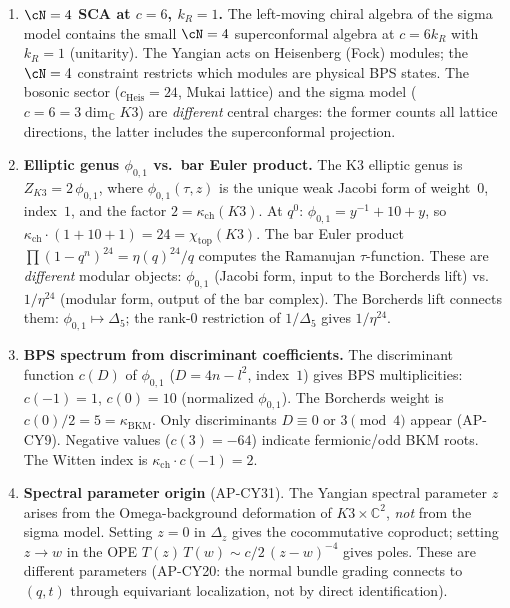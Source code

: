 \begin{enumerate}
\item \textbf{$\cN = 4$ SCA at $c = 6$, $k_R = 1$.}
  The left-moving chiral algebra of the sigma model contains the
  small $\cN = 4$ superconformal algebra at $c = 6 k_R$ with $k_R = 1$
  (unitarity).  The Yangian acts on Heisenberg (Fock) modules; the
  $\cN = 4$ constraint restricts which modules are physical BPS states.
  The bosonic sector ($c_{\mathrm{Heis}} = 24$, Mukai lattice) and the
  sigma model ($c = 6 = 3 \dim_{\mathbb{C}} K3$) are \emph{different}
  central charges: the former counts all lattice directions, the latter
  includes the superconformal projection.

\item \textbf{Elliptic genus $\phi_{0,1}$ vs.\ bar Euler product.}
  The K3 elliptic genus is $Z_{K3} = 2\,\phi_{0,1}$, where
  $\phi_{0,1}(\tau, z)$ is the unique weak Jacobi form of weight~$0$,
  index~$1$, and the factor $2 = \kappa_{\mathrm{ch}}(K3)$.
  At $q^0$: $\phi_{0,1} = y^{-1} + 10 + y$,
  so $\kappa_{\mathrm{ch}} \cdot (1 + 10 + 1) = 24 = \chi_{\mathrm{top}}(K3)$.
  The bar Euler product $\prod(1 - q^n)^{24} = \eta(q)^{24}/q$ computes
  the Ramanujan $\tau$-function.
  These are \emph{different} modular objects: $\phi_{0,1}$ (Jacobi form,
  input to the Borcherds lift) vs.\ $1/\eta^{24}$ (modular form, output
  of the bar complex).  The Borcherds lift connects them:
  $\phi_{0,1} \mapsto \Delta_5$; the rank-$0$ restriction of
  $1/\Delta_5$ gives $1/\eta^{24}$.

\item \textbf{BPS spectrum from discriminant coefficients.}
  The discriminant function $c(D)$ of $\phi_{0,1}$ ($D = 4n - l^2$,
  index~$1$) gives BPS multiplicities: $c(-1) = 1$, $c(0) = 10$
  (normalized $\phi_{0,1}$).
  The Borcherds weight is $c(0)/2 = 5 = \kappa_{\mathrm{BKM}}$.
  Only discriminants $D \equiv 0$ or $3 \pmod{4}$ appear (AP-CY9).
  Negative values ($c(3) = -64$) indicate fermionic/odd BKM roots.
  The Witten index is $\kappa_{\mathrm{ch}} \cdot c(-1) = 2$.

\item \textbf{Spectral parameter origin} (AP-CY31).
  The Yangian spectral parameter $z$ arises from the Omega-background
  deformation of $K3 \times \mathbb{C}^2$, \emph{not} from the sigma model.
  Setting $z = 0$ in $\Delta_z$ gives the cocommutative coproduct;
  setting $z \to w$ in the OPE $T(z)\,T(w) \sim c/2\,(z-w)^{-4}$
  gives poles.  These are different parameters (AP-CY20: the normal
  bundle grading connects to $(q,t)$ through equivariant localization,
  not by direct identification).


\end{enumerate}

